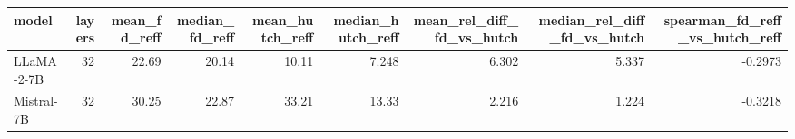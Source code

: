 \begin{tabular}{lrrrrrrrr}
\toprule
model & layers & mean_fd_reff & median_fd_reff & mean_hutch_reff & median_hutch_reff & mean_rel_diff_fd_vs_hutch & median_rel_diff_fd_vs_hutch & spearman_fd_reff_vs_hutch_reff \\
\midrule
LLaMA-2-7B & 32 & 22.69 & 20.14 & 10.11 & 7.248 & 6.302 & 5.337 & -0.2973 \\
Mistral-7B & 32 & 30.25 & 22.87 & 33.21 & 13.33 & 2.216 & 1.224 & -0.3218 \\
\bottomrule
\end{tabular}
